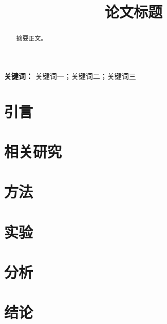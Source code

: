 \documentclass[UTF8,11pt]{ctexart}
\title{论文标题}
\author{}
\date{}
\begin{document}
\maketitle

\begin{abstract}
摘要正文。
\end{abstract}

\noindent\textbf{关键词：} 关键词一；关键词二；关键词三

\section{引言}

\section{相关研究}

\section{方法}

\section{实验}

\section{分析}

\section{结论}



\end{document}
